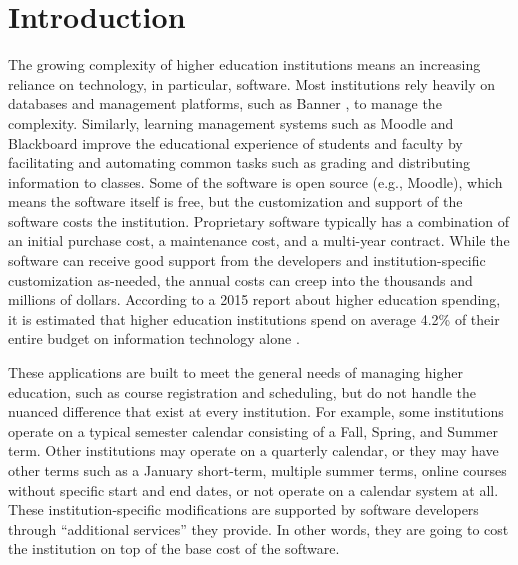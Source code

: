 \section{Introduction}

The growing complexity of higher education institutions means an increasing reliance on technology, in particular, software. Most institutions rely heavily on databases and management platforms, such as Banner \cite{BannerWebsite}, to manage the complexity. Similarly, learning management systems such as Moodle \cite{MoodleWebsite} and Blackboard \cite{BlackboardWebsite} improve the educational experience of students and faculty by facilitating and automating common tasks such as grading and distributing information to classes. Some of the software is open source (e.g., Moodle), which means the software itself is free, but the customization and support of the software costs the institution. Proprietary software typically has a combination of an initial purchase cost, a maintenance cost, and a multi-year contract. While the software can receive good support from the developers and institution-specific customization as-needed, the annual costs can creep into the thousands and millions of dollars. According to a 2015 report about higher education spending, it is estimated that higher education institutions spend on average 4.2\% of their entire budget on information technology alone \cite{CDSBenchmarkReport}. 



These applications are built to meet the general needs of managing higher education, such as course registration and scheduling, but do not handle the nuanced difference that exist at every institution. For example, some institutions operate on a typical semester calendar consisting of a Fall, Spring, and Summer term. Other institutions may operate on a quarterly calendar, or they may have other terms such as a January short-term, multiple summer terms, online courses without specific start and end dates, or not operate on a calendar system at all. These institution-specific modifications are supported by software developers through ``additional services'' they provide. In other words, they are going to cost the institution on top of the base cost of the software.

